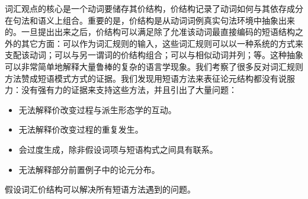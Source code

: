 \begin{exe}
\begin{xlist}[iv.]
\begin{exe}
\begin{xlist}[iv.]
词汇观点的核心是一个动词要储存其价结构，价结构记录了动词如何与其依存成分在句法和语义上组合。重要的是，价结构是从动词词例真实句法环境中抽象出来的。一旦提出出来之后，价结构可以满足除了允准该动词最直接编码的短语结构之外的其它方面：可以作为词汇规则的输入，这些词汇规则可以以一种系统的方式来支配该动词；可以与另一谓词的价结构组合；可以与相似动词并列；等。这种抽象可以非常简单地解释大量鲁棒的复杂的语言学现象。我们考察了很多反对词汇规则方法赞成短语模式方式的证据。我们发现用短语方法来表征论元结构都没有说服力：没有强有力的证据来支持这些方法，并且引出了大量问题：
\begin{itemize}
\item 无法解释价改变过程与派生形态学的互动。
\item 无法解释价改变过程的重复发生。
\item 会过度生成，除非假设词项与短语构式之间具有联系。
\item 无法解释部分前置例子中的论元分布。
\end{itemize}
假设词汇价结构可以解决所有短语方法遇到的问题。


\end{xlist}
\end{exe}
\end{xlist}
\end{exe}
